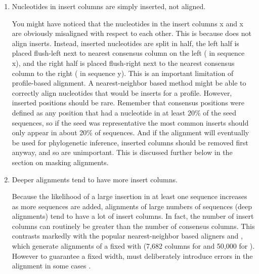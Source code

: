 \begin{enumerate}
\item 
Nucleotides in insert columns are simply inserted, not aligned.

You might have noticed that the nucleotides in the insert columns x
and x are obviously misaligned with respect to each other. This is
because  does not align inserts. Instead, inserted
nucleotides are split in half, the left half is placed flush-left next
to nearest consensus column on the left ( in sequence x), and
the right half is placed flush-right next to the nearest consensus
column to the right ( in sequence y). This is an important
limitation of profile-based alignment. A nearest-neighbor based
method might be able to correctly align nucleotides that would be
inserts for a profile. However, inserted positions
should be rare. Remember that consensus positions were defined as any
position that had a nucleotide in at least 20\% of the seed
sequences, so if the seed was representative the most common inserts
should only appear in about 20\% of sequences. And if the alignment will
eventually be used for phylogenetic inference, inserted columns should
be removed first anyway, and so are unimportant. This is discussed
further below in the section on masking alignments.

\item 
Deeper alignments tend to have more insert columns. 

Because the likelihood of a large insertion in at least one sequence
increases as more sequences are added, alignments of large numbers of
sequences (deep alignments) tend to have a lot of insert columns. In
fact, the number of insert columns can routinely be greater than the
number of consensus columns. This contrasts markedly with the popular
nearest-neighbor based aligners  and , which
generate alignments of a fixed with (7,682 columns for  and
50,000 for ). However to guarantee a fixed width, 
must deliberately introduce errors in the alignment in some cases
\cite{DeSantis06}. 

\end{enumerate}

